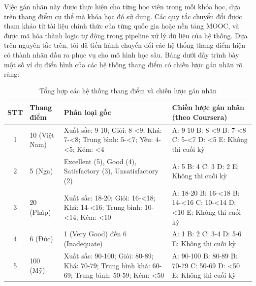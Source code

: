 Việc gán nhãn này được thực hiện cho từng học viên trong mỗi khóa học, dựa trên thang điểm cụ thể mà khóa học đó sử dụng. Các quy tắc chuyển đổi được tham khảo từ tài liệu chính thức của từng quốc gia hoặc nền tảng MOOC, và được mã hóa thành logic tự động trong pipeline xử lý dữ liệu của hệ thống.
\noindent Dựa trên nguyên tắc trên, tôi đã tiến hành chuyển đổi các hệ thống thang điểm hiện có thành nhãn đầu ra phục vụ cho mô hình học sâu. Bảng dưới đây trình bày một số ví dụ điển hình của các hệ thống thang điểm có chiến lược gán nhãn rõ ràng:

\begin{table}[H]
\centering
\caption{Tổng hợp các hệ thống thang điểm và chiến lược gán nhãn}
\begin{tabular}{|c|p{2.5cm}|p{2.8cm}|p{6cm}|}
\hline
\textbf{STT} & \textbf{Thang điểm} & \textbf{Phân loại gốc} & \textbf{Chiến lược gán nhãn (theo Coursera)} \\
\hline
1 & 10 (Việt Nam) & Xuất sắc: 9-10; Giỏi: 8-<9; Khá: 7-<8; Trung bình: 5-<7; Yếu: 4-<5; Kém: <4 & 
A: 9-10 \newline
B: 8-<9 \newline
B: 7-<8 \newline
C: 5-<7 \newline
D: <5 \newline
E: Không thi cuối kỳ \\
\hline
2 & 5 (Nga) & Excellent (5), Good (4), Satisfactory (3), Unsatisfactory (2) & 
A: 5 \newline
B: 4 \newline
C: 3 \newline
D: 2 \newline
E: Không thi cuối kỳ \\
\hline
3 & 20 (Pháp) & Xuất sắc: 18-20; Giỏi: 16-<18; Khá: 14-<16; Trung bình: 10-<14; Kém: <10 & 
A: 18-20 \newline
B: 16-<18 \newline
B: 14-<16 \newline
C: 10-<14 \newline
D: <10 \newline
E: Không thi cuối kỳ \\
\hline
4 & 6 (Đức) & 1 (Very Good) đến 6 (Inadequate) & 
A: 1 \newline
B: 2 \newline
C: 3-4 \newline
D: 5-6 \newline
E: Không thi cuối kỳ \\
\hline
5 & 100 (Mỹ) & Xuất sắc: 90-100; Giỏi: 80-89; Khá: 70-79; Trung bình khá: 60-69; Trung bình: 50-59; Kém: <50 & 
A: 90-100 \newline
B: 80-89 \newline
B: 70-79 \newline
C: 50-69 \newline
D: <50 \newline
E: Không thi cuối kỳ \\
\hline
\end{tabular}
\label{tab:grading_conversion}
\end{table}

